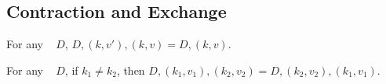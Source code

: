 \subsection{Contraction and Exchange}


\begin{theorem}
\label{thm:cont-dicts}

\breakAndIndent
%
For any {\dd}~ $D$,
%
$D, (k, v'), (k, v) = D, (k, v)$.

\end{theorem}

\begin{theorem}
\label{thm:exch-dicts}

\breakAndIndent
%
For any {\dd}~ $D$,
%
if $k_1 \ne k_2$, then
%
$D, (k_1, v_1), (k_2, v_2) = D, (k_2, v_2), (k_1, v_1)$.

\end{theorem}
